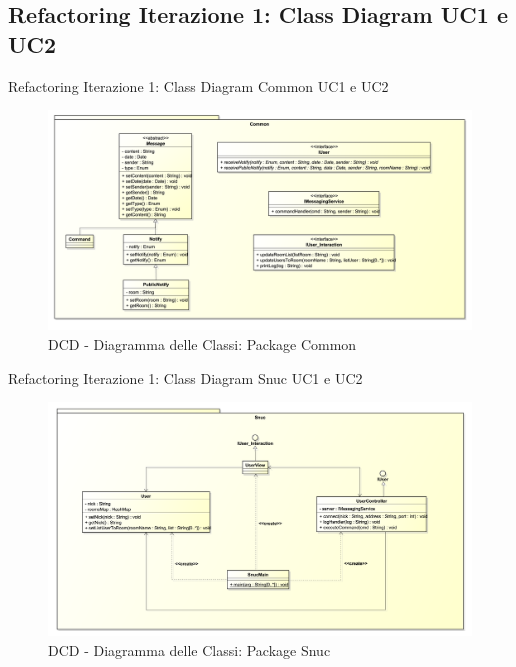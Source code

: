 \subsection{Refactoring Iterazione 1: Class Diagram UC1 e UC2}
\begin{frame} {Refactoring Iterazione 1: Class Diagram Common UC1 e UC2}
   \begin{figure}
     \includegraphics[scale=0.155]{image_astah/Iteration_1_DesignModel_Refactored/ClassDiagramCommon.png}{\centering}
     \caption{DCD - Diagramma delle Classi: Package Common }
     \label{fig_UC1_UC2_DCDR_1} 
   \end{figure}
\end{frame}

\begin{frame} {Refactoring Iterazione 1: Class Diagram Snuc UC1 e UC2}
   \begin{figure}
     \includegraphics[scale=0.155]{image_astah/Iteration_1_DesignModel_Refactored/ClassDiagramSnuc.png}{\centering}
     \caption{DCD - Diagramma delle Classi: Package Snuc }
     \label{fig_UC1_UC2_DCDR_2} 
   \end{figure}
\end{frame}

